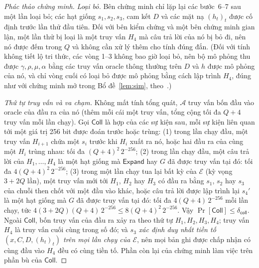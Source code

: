 \begin{proof}[Phác thảo chứng minh]
\emph{Loại bỏ.} Bên chứng minh chỉ lặp lại các bước~6--7 sau một lần loại bỏ;
các hạt giống $s_1,s_2,s_3$, cam kết $D$ và các mặt nạ $(h_t)_t$ được cố định
trước lần thử đầu tiên. Đối với bên kiểm chứng và một bên chứng minh gian lận,
một lần thử bị loại là một truy vấn $H_4$ mà câu trả lời của nó bị bỏ đi, nên
nó được đếm trong $Q$ và không cần xử lý thêm cho tính đúng đắn. (Đối với tính
không tiết lộ tri thức, các vòng 1--3 không bao giờ loại bỏ, nên bộ mô phỏng
thu được $\gamma,\rho,\mu,\alpha$ bằng các truy vấn oracle thông thường trên
$D$ và $h$ được mô phỏng của nó, và chỉ vòng cuối có loại bỏ được mô phỏng bằng
cách lập trình $H_4$, đúng như với chứng minh mở trong
Bổ đề~\ref{lem:sim}, theo~\cite{ref:barbosa,ref:devevey}.)

\emph{Thứ tự truy vấn và va chạm.} Không mất tính tổng quát, $\mathcal A$ truy
vấn bốn đầu vào oracle của đầu ra của nó (thêm mỗi cái một truy vấn, tổng cộng
tối đa $Q+4$ truy vấn mỗi lần chạy). Gọi $\mathsf{Coll}$ là hợp của các sự kiện
sau, mỗi sự kiện liên quan tới một giá trị 256 bit được đoán trước hoặc trùng:
(1) trong lần chạy đầu, một truy vấn $H_{i+1}$ chứa một $s_i$ trước khi $H_i$
xuất ra nó, hoặc hai đầu ra của cùng một $H_i$ trùng nhau: tối đa
$(Q+4)^2\,2^{-256}$; (2) trong lần chạy đầu, một câu trả lời của $H_1,\dots,H_4$
là một hạt giống mà $\mathsf{Expand}$ hay $G$ đã được truy vấn tại đó: tối đa
$4(Q+4)^2\,2^{-256}$; (3) trong một lần chạy tua lại bất kỳ của $\mathcal E$
(kỳ vọng $3+2Q$ lần), một truy vấn mới tới $H_1$, $H_2$ hay $H_3$ có đầu ra bằng
$s_1$, $s_2$ hay $s_3$ của chuỗi then chốt với một đầu vào khác, hoặc câu trả lời
được lập trình lại $s_4'$ là một hạt giống mà $G$ đã được truy vấn tại đó: tối đa
$4(Q+4)\,2^{-256}$ mỗi lần chạy, tức $4(3+2Q)(Q+4)\,2^{-256}\le8(Q+4)^2\,2^{-256}$.
Vậy $\Pr[\mathsf{Coll}]\le\delta_{\mathsf{coll}}$. Ngoài $\mathsf{Coll}$, bốn
truy vấn của đầu ra xảy ra theo thứ tự $H_1,H_2,H_3,H_4$; truy vấn $H_4$ là
truy vấn cuối cùng trong số đó; và \emph{$s_3$ xác định duy nhất tiền tố
$(x,C,D,(h_t)_t)$ trên mọi lần chạy của $\mathcal E$}, nên mọi bản ghi được chấp
nhận có cùng đầu vào $H_4$ đều có cùng tiền tố. Phần còn lại của chứng minh làm
việc trên phần bù của $\mathsf{Coll}$.


\end{proof}
